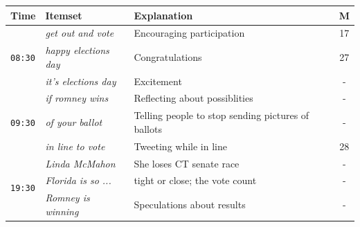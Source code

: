 \documentclass{sig-alternate}
\begin{document}


\begin{table}

\begin{center}
\footnotesize
\def\arraystretch{1.2}
\begin{tabular}{|p{0.7cm}|p{2.5cm}|p{4cm}|c|}
\hline
\textbf{Time} & \textbf{Itemset} & \textbf{Explanation} & \textbf{M} \\ \hline
\multirow{3}{*}{\texttt{08:30}}
& \em get out and vote & Encouraging participation & 17 \\ \cline{2-4}
& \em \scriptsize happy elections day & Congratulations & 27 \\ \cline{2 - 4}
& \em it's elections day & Excitement  & - \\ \hline

\multirow{3}{*}{\texttt{09:30}}
& \em if romney wins & Reflecting about possiblities & - \\ \cline{2 - 4} %
& \em of your ballot & Telling people to stop sending pictures of ballots & - \\ \cline{2-4}
& \em in line to vote & Tweeting while in line  & 28 \\ \hline


\multirow{3}{*}{\texttt{19:30}}
& \em Linda  McMahon		&  She loses CT senate race & - \\ \cline{2 - 4}
& \em Florida is so ... & tight or close; the vote count  & - \\ \cline{2-4}
& \em \small Romney is winning & Speculations about results  & - \\ \hline %



\end{tabular}
\end{center}
\end{table}
\end{document}
